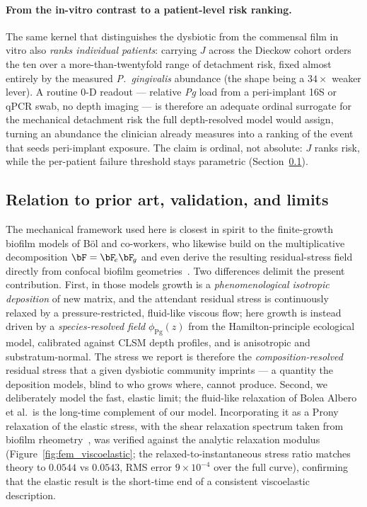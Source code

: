 \paragraph{From the in-vitro contrast to a patient-level risk ranking.} The same kernel that
distinguishes the dysbiotic from the commensal film in vitro also \emph{ranks individual
patients}: carrying $J$ across the Dieckow cohort orders the ten over a more-than-twentyfold
range of detachment risk, fixed almost entirely by the
measured \textit{P.~gingivalis} abundance (the shape being a $34\times$ weaker lever). A
routine 0-D readout --- relative \textit{Pg} load from a peri-implant 16S or qPCR swab, no
depth imaging --- is therefore an adequate ordinal surrogate for the mechanical detachment
risk the full depth-resolved model would assign, turning an abundance the clinician already
measures into a ranking of the event that seeds peri-implant exposure. The claim is ordinal,
not absolute: $J$ ranks risk, while the per-patient failure threshold stays parametric
(Section~\ref{sec:fem_validation}).

\subsection{Relation to prior art, validation, and limits}
\label{sec:fem_validation}

The mechanical framework used here is closest in spirit to the finite-growth biofilm
models of B{\"o}l and co-workers, who likewise build on the multiplicative
decomposition $\bF=\bF_{\!e}\bF_{\!g}$ and even derive the resulting residual-stress
field directly from confocal biofilm geometries~\cite{Bol2009Detachment,
BoleaAlbero2014}. Two differences delimit the present contribution. First, in those
models growth is a \emph{phenomenological isotropic deposition} of new matrix, and
the attendant residual stress is continuously relaxed by a pressure-restricted,
fluid-like viscous flow; here growth is instead driven by a \emph{species-resolved
field} $\phi_\mathrm{Pg}(z)$ from the Hamilton-principle ecological model, calibrated
against CLSM depth profiles, and is anisotropic and substratum-normal. The stress we
report is therefore the \emph{composition-resolved} residual stress that a given
dysbiotic community imprints --- a quantity the deposition models, blind to who grows
where, cannot produce. Second, we deliberately model the fast, elastic limit; the
fluid-like relaxation of Bolea Albero et al.\ is the long-time complement of our
model. Incorporating it as a Prony relaxation of the elastic stress, with the shear
relaxation spectrum taken from biofilm rheometry~\cite{Shaw2004Burger}, was verified
against the analytic relaxation modulus (Figure~\ref{fig:fem_viscoelastic}; the
relaxed-to-instantaneous stress ratio matches theory to $0.0544$ vs $0.0543$, RMS
error $9\times10^{-4}$ over the full curve), confirming that the elastic result is the
short-time end of a consistent viscoelastic description.

